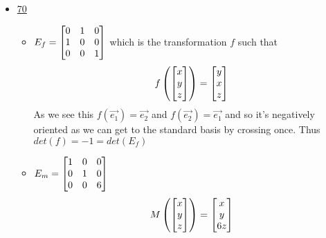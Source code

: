 \documentclass[11pt]{book}
\begin{document}
\begin{itemize}
\begin{itemize}
            \item We start by proving the following claim. For any two linear transformations $S$, $T$ 
                \[
                V\left(S \circ T \left(R\right) \right) = \mathit{det} \left(S\right)  \cdot \mathit{det} \left(T\right)  \cdot V\left(R\right) 
                \]
            \begin{proof}
                \begin{align*}
                    V\left(S \circ T \left(R\right) \right) &= \mathit{det} \left(S\right)  \cdot V\left(T\left(R\right) \right)   \\ 
                    &= \mathit{det} \left(S\right)  \cdot \mathit{det} \left(T\right)  \cdot V\left(R\right)  
                \end{align*}
            \end{proof}
            \begin{crly}
                for any two square matricies $A,B$ 
                \[
                \mathit{det} \left(AB\right) = \mathit{det} \left(A\right) \mathit{det} \left(B\right) 
                \]
                As $A,B$ must induce a transformation 
            \end{crly}
        \end{itemize}
    \item \underline{70} 
        \begin{itemize}
            \item $E_{f} = \begin{bmatrix} 0 & 1 & 0 \\ 1 & 0 & 0 \\ 0 & 0 & 1 \end{bmatrix} $ which is the transformation $f$ such that 
                \[
                f\left(\begin{bmatrix} x \\ y \\ z \end{bmatrix} \right) = \begin{bmatrix} y \\ x \\ z \end{bmatrix} 
                \]
                As we see this $f\left(\vec{e_1} \right) = \vec{e_2} $ and $f\left(\vec{e_2} \right) = \vec{e_1} $ and so it's negatively oriented as we can get to the standard basis by crossing once. Thus $\mathit{det} \left(f\right) = -1= \mathit{det} \left(E_{f} \right) $ 
            \item $E_{m} = \begin{bmatrix} 1 & 0 & 0 \\ 0 & 1 & 0 \\ 0 & 0 & 6 \end{bmatrix}$ 
                \[
                M\left(\begin{bmatrix} x \\ y \\ z \end{bmatrix} \right) = \begin{bmatrix} x \\ y \\ 6z \end{bmatrix} 
\]
\end{itemize}
\end{itemize}
\end{document}
